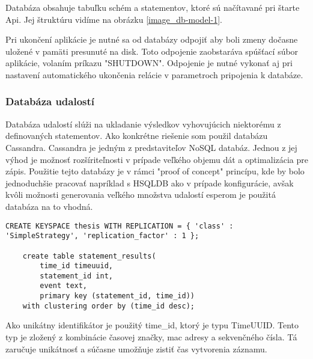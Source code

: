 		Databáza obsahuje tabuľku schém a statementov, ktoré sú načítavané pri štarte Api. Jej štruktúru vidíme na obrázku \ref{image_db-model-1}.
		
		Pri ukončení aplikácie je nutné sa od databázy odpojiť aby boli zmeny dočasne uložené v pamäti presunuté na disk. Toto odpojenie zaobstaráva spúšťací súbor aplikácie, volaním príkazu "SHUTDOWN". Odpojenie je nutné vykonať aj pri nastavení automatického ukončenia relácie v parametroch pripojenia k databáze.
			
		\subsubsection{Databáza udalostí}
		Databáza udalostí slúži na ukladanie výsledkov vyhovujúcich niektorému z definovaných statementov. Ako konkrétne riešenie som použil databázu Cassandra. Cassandra je jedným z predstaviteľov NoSQL databáz. Jednou z jej výhod je možnosť rozšíriteľnosti v prípade veľkého objemu dát a optimalizácia pre zápis. Použitie tejto databázy je v rámci "proof of concept" princípu, kde by bolo jednoduchšie pracovať napríklad s HSQLDB ako v prípade konfigurácie, avšak kvôli možnosti generovania veľkého množstva udalostí esperom je použitá databáza na to vhodná.
		
		\begin{lstlisting}[label=lst:xxx,caption=yyy]
	CREATE KEYSPACE thesis WITH REPLICATION = { 'class' : 'SimpleStrategy', 'replication_factor' : 1 };

	create table statement_results(
		time_id timeuuid,
		statement_id int,
		event text,
		primary key (statement_id, time_id))
	with clustering order by (time_id desc);
		\end{lstlisting}
		
		
		
		Ako unikátny identifikátor je použitý time\_id, ktorý je typu TimeUUID. Tento typ je zložený z kombinácie časovej značky, mac adresy a sekvenčného čísla. Tá zaručuje unikátnosť a súčasne umožňuje zistiť čas vytvorenia záznamu.
		

